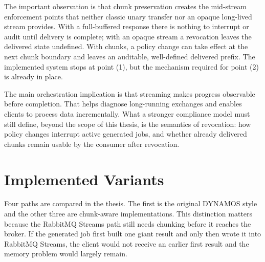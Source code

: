 The important observation is that chunk preservation creates the mid-stream enforcement points that neither classic unary transfer nor an opaque long-lived stream provides. With a full-buffered response there is nothing to interrupt or audit until delivery is complete; with an opaque stream a revocation leaves the delivered state undefined. With chunks, a policy change can take effect at the next chunk boundary and leaves an auditable, well-defined delivered prefix. The implemented system stops at point (1), but the mechanism required for point (2) is already in place.

The main orchestration implication is that streaming makes progress observable before completion. That helps diagnose long-running exchanges and enables clients to process data incrementally. What a stronger compliance model must still define, beyond the scope of this thesis, is the semantics of revocation: how policy changes interrupt active generated jobs, and whether already delivered chunks remain usable by the consumer after revocation.

\section{Implemented Variants}

Four paths are compared in the thesis. The first is the original DYNAMOS style and the other three are chunk-aware implementations. This distinction matters because the RabbitMQ Streams path still needs chunking before it reaches the broker. If the generated job first built one giant result and only then wrote it into RabbitMQ Streams, the client would not receive an earlier first result and the memory problem would largely remain.

